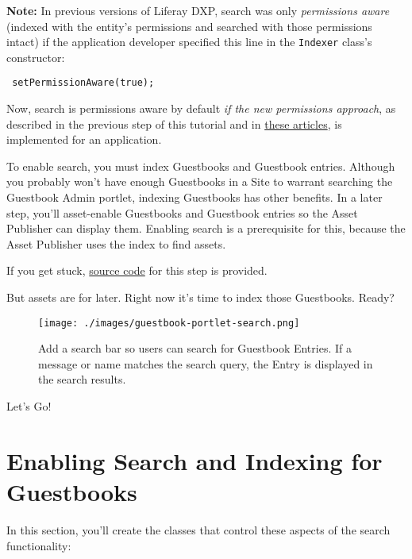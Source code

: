 \noindent\hrulefill

\textbf{Note:} In previous versions of Liferay DXP, search was only
\emph{permissions aware} (indexed with the entity's permissions and
searched with those permissions intact) if the application developer
specified this line in the \texttt{Indexer} class's constructor:

\begin{verbatim}
 setPermissionAware(true);
\end{verbatim}

Now, search is permissions aware by default \emph{if the new permissions
approach}, as described in the previous step of this tutorial and in
\href{/docs/7-2/frameworks/-/knowledge_base/f/defining-application-permissions}{these
articles}, is implemented for an application.

\noindent\hrulefill

To enable search, you must index Guestbooks and Guestbook entries.
Although you probably won't have enough Guestbooks in a Site to warrant
searching the Guestbook Admin portlet, indexing Guestbooks has other
benefits. In a later step, you'll asset-enable Guestbooks and Guestbook
entries so the Asset Publisher can display them. Enabling search is a
prerequisite for this, because the Asset Publisher uses the index to
find assets.

If you get stuck,
\href{https://github.com/liferay/liferay-docs/tree/master/en/developer/tutorials/code/guestbook/08-search/com-liferay-docs-guestbook}{source
code} for this step is provided.

But assets are for later. Right now it's time to index those Guestbooks.
Ready?

\begin{figure}
\centering
\texttt{[image: ./images/guestbook-portlet-search.png]}
\caption{Add a search bar so users can search for Guestbook Entries. If
a message or name matches the search query, the Entry is displayed in
the search results.}
\end{figure}

Let's Go!{}

\chapter{Enabling Search and Indexing for
Guestbooks}\label{enabling-search-and-indexing-for-guestbooks}

In this section, you'll create the classes that control these aspects of
the search functionality:

